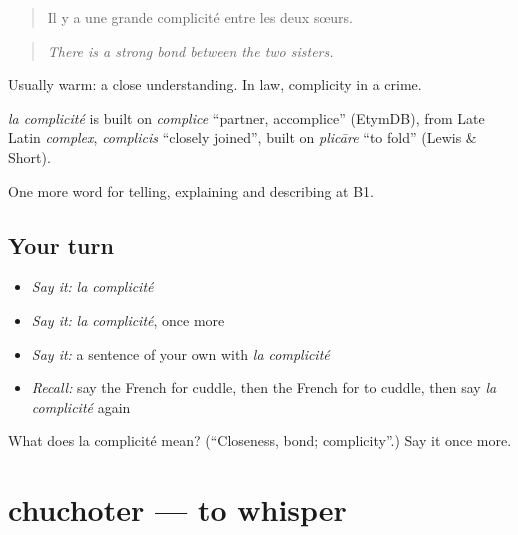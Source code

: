 \begin{quote}
Il y a une grande complicité entre les deux sœurs.
\end{quote}

\begin{quote}
\emph{There is a strong bond between the two sisters.}
\end{quote}

Usually warm: a close understanding. In law, complicity in a crime.

\begin{cousinweb}
\emph{la complicité} is built on \emph{complice} \textquotedblleft{}partner, accomplice\textquotedblright{} (EtymDB), from Late Latin \emph{complex}, \emph{complicis} \textquotedblleft{}closely joined\textquotedblright{}, built on \emph{plicāre} \textquotedblleft{}to fold\textquotedblright{} (Lewis \& Short).
\end{cousinweb}

\begin{grammarlens}[title={What you've built}]
One more word for telling, explaining and describing at B1.
\end{grammarlens}

\subsection*{Your turn}
\begin{itemize}
\raggedright
  \item \emph{Say it:} \emph{la complicité}
  \item \emph{Say it:} \emph{la complicité}, once more
  \item \emph{Say it:} a sentence of your own with \emph{la complicité}
  \item \emph{Recall:} say the French for cuddle, then the French for to cuddle, then say \emph{la complicité} again
\end{itemize}

\begin{tcolorbox}[breakable,colback=teal!4,colframe=teal!35!black,title={Before you move on}]
What does la complicité mean? (\textquotedblleft{}Closeness, bond; complicity\textquotedblright{}.) Say it once more.
\end{tcolorbox}
\section[chuchoter]{chuchoter — to whisper}

\label{lesson:FR-C488-chuchoter}




